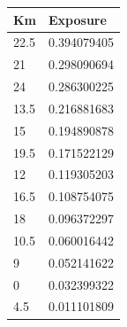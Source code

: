 \begin{longtable}{|l|l|}
	\centering
	\rowcolor[HTML]{9B9B9B} \textbf{Km} & \textbf{Exposure} \\ \hline
     \rowcolor[HTML]{F8FF00} 
     22.5                                                    & 0.394079405                                                   \\
     \rowcolor[HTML]{F8FF00} 
     21                                                      & 0.298090694                                                   \\
     \rowcolor[HTML]{F8FF00} 
     24                                                      & 0.286300225                                                   \\
     \rowcolor[HTML]{F8FF00} 
     13.5                                                    & 0.216881683                                                   \\
     \rowcolor[HTML]{32CB00} 
     15                                                      & 0.194890878                                                   \\
     \rowcolor[HTML]{32CB00} 
     19.5                                                    & 0.171522129                                                   \\
     \rowcolor[HTML]{32CB00} 
     12                                                      & 0.119305203                                                   \\
     \rowcolor[HTML]{32CB00} 
     16.5                                                    & 0.108754075                                                   \\
     \rowcolor[HTML]{32CB00} 
     18                                                      & 0.096372297                                                   \\
     \rowcolor[HTML]{32CB00} 
     10.5                                                    & 0.060016442                                                   \\
     \rowcolor[HTML]{32CB00} 
     9                                                       & 0.052141622                                                   \\
     \rowcolor[HTML]{32CB00} 
     0                                                       & 0.032399322                                                   \\
     \rowcolor[HTML]{32CB00} 
     4.5                                                     & 0.011101809                                                   \\

\end{longtable}

